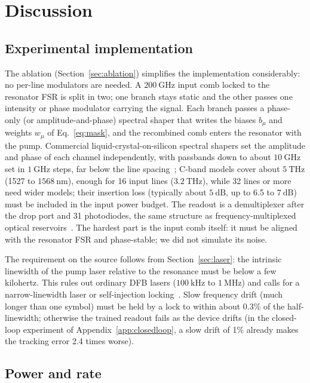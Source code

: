 \section{Discussion}\label{sec:discussion}

\subsection{Experimental implementation}

The ablation (Section~\ref{sec:ablation}) simplifies the implementation considerably: no per-line modulators are needed. A
$200~\mathrm{GHz}$ input comb locked to the resonator FSR is split in two; one branch stays static and the other passes one intensity
or phase modulator carrying the signal. Each branch passes a phase-only (or amplitude-and-phase) spectral shaper that writes the biases
$b_\mu$ and weights $w_\mu$ of Eq.~\eqref{eq:mask}, and the recombined comb enters the resonator with the pump.
Commercial liquid-crystal-on-silicon spectral shapers set the amplitude and phase of each channel independently, with passbands down
to about $10~\mathrm{GHz}$ set in $1~\mathrm{GHz}$ steps, far below the line spacing~\cite{coherent_waveshaper}; C-band models cover
about $5~\mathrm{THz}$ (1527 to $1568~\mathrm{nm}$), enough for 16 input lines ($3.2~\mathrm{THz}$), while 32 lines or more need wider
models; their insertion loss (typically about $5~\mathrm{dB}$, up to 6.5 to $7~\mathrm{dB}$) must be included in the input power
budget. The readout is a demultiplexer after the drop port and 31 photodiodes, the same structure as frequency-multiplexed optical
reservoirs~\cite{butschek2020,lupo2023}. The hardest part is the input comb itself: it must be aligned with the resonator FSR and
phase-stable; we did not simulate its noise.

The requirement on the source follows from Section~\ref{sec:laser}: the intrinsic linewidth of the pump laser relative to the
resonance must be below a few kilohertz. This rules out ordinary DFB lasers ($100~\mathrm{kHz}$ to $1~\mathrm{MHz}$) and calls for a
narrow-linewidth laser or self-injection locking~\cite{liang2015,kondratiev2017,shen2020,jin2021}. Slow frequency drift (much longer than one symbol) must be
held by a lock to within about 0.3\% of the half-linewidth; otherwise the trained readout fails as the device drifts (in the
closed-loop experiment of Appendix~\ref{app:closedloop}, a slow drift of 1\% already makes the tracking error 2.4 times worse).

\subsection{Power and rate}

